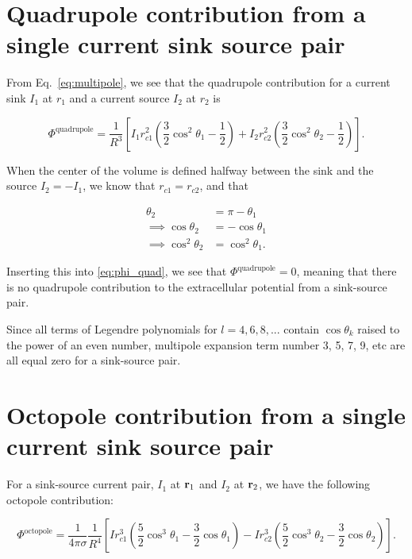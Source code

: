\section{Quadrupole contribution from a single current sink source pair}\label{subsec:quad}

From Eq.~\ref{eq:multipole}, we see that the quadrupole contribution for a current sink $I_1$ at $r_1$ and a current source $I_2$ at $r_2$ is

\begin{equation}\label{eq:phi_quad}
\Phi^{\mathrm{quadrupole}} = \frac{1}{R^3} \left[ I_1 r_{c1}^2 \left( \frac{3}{2} \cos^2 \theta_1 - \frac{1}{2} \right) + I_2 r_{c2}^2 \left( \frac{3}{2} \cos^2 \theta_2 - \frac{1}{2} \right) \right].
\end{equation}

When the center of the volume is defined halfway between the sink and the source $I_2 = -I_1$, we know that $r_{c1} = r_{c2}$, and that

\begin{align*}
\theta_2 &= \pi - \theta_1 \\
\implies \cos \theta_2 &= -\cos \theta_1 \\
\implies \cos^2 \theta_2 &= \cos^2 \theta_1.
\end{align*}

Inserting this into \eqref{eq:phi_quad}, we see that $\Phi^{\mathrm{quadrupole}} = 0$, meaning that there is no quadrupole contribution to the extracellular potential from a sink-source pair.

Since all terms of Legendre polynomials for $l = 4, 6, 8, ...$ contain $\cos \theta_k$ raised to the power of an even number, multipole expansion term number 3, 5, 7, 9, etc are all equal zero for a sink-source pair.

\section{Octopole contribution from a single current sink source pair}\label{subsec:octo}

For a sink-source current pair, $I_1$ at ${\bf r}_1$ and $I_2$ at ${\bf r}_2$, we have the following octopole contribution:

\begin{equation*}
\Phi^{\mathrm{octopole}} = \frac{1}{4 \pi \sigma} \frac{1}{R^4}\left[ 
I r_{c1}^3 \left( \frac{5}{2} \cos^3 \theta_1 - 
\frac{3}{2}\cos \theta_1 \right) - 
I r_{c2}^3 \left( \frac{5}{2} \cos^3 \theta_2
 - \frac{3}{2} \cos \theta_2 \right)
\right].
\end{equation*}

